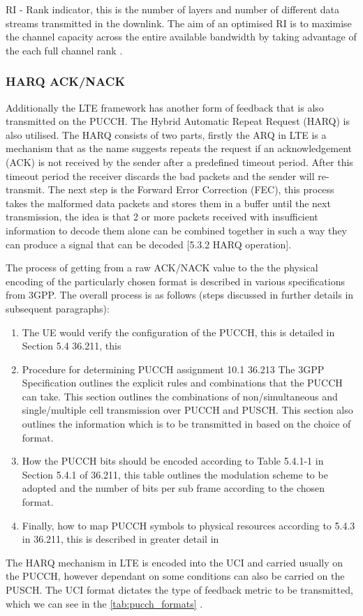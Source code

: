 \documentclass{article}
\begin{document}
RI - Rank indicator,  this is the number of layers and number of different data streams transmitted in the downlink. The aim of an optimised RI is to maximise the channel capacity across the entire available bandwidth by taking advantage of the each full channel rank  \cite{csi_defs}. 

\subsubsection{HARQ ACK/NACK}

Additionally the LTE framework has another form of feedback that is also transmitted on the PUCCH. The Hybrid Automatic Repeat Request (HARQ) is also utilised. The HARQ consists of two parts, firstly the ARQ in LTE is a mechanism that as the name suggests repeats the request if an acknowledgement (ACK) is not received by the sender after a predefined timeout period.  After this timeout period the receiver discards the bad packets and the sender will re-transmit. The next step is the Forward Error Correction (FEC), this process takes the malformed data packets and stores them in a buffer until the next transmission, the idea is that 2 or more packets received with insufficient information to decode them alone can be combined together in such a way they can produce a signal that can be decoded \cite{3gpp36321}[5.3.2 HARQ operation].

The process of getting from a raw ACK/NACK value to the  the physical encoding of the particularly chosen format is described in various specifications from 3GPP. The overall process is as follows (steps discussed in further details in subsequent paragraphs):
\begin{enumerate}\label{proc_pucch_configs}
    \item The UE would verify the configuration of the PUCCH, this is detailed in Section 5.4 36.211, this 
    \item Procedure for determining PUCCH assignment 10.1 36.213 The 3GPP Specification outlines the explicit rules and combinations that the PUCCH can take. This section outlines the combinations of non/simultaneous and single/multiple cell transmission over PUCCH and PUSCH. This section also outlines the information which is to be transmitted in based on the choice of format. 
    \item How the PUCCH bits should be encoded according to Table 5.4.1-1 in Section 5.4.1 of 36.211, this table outlines the modulation scheme to be adopted and the number of bits per sub frame according to the chosen format.
    \item Finally, how to map PUCCH symbols to physical resources according to 5.4.3 in 36.211, this is described in greater detail in  
\end{enumerate} 
The HARQ mechanism in LTE is encoded into the UCI and carried usually on the PUCCH, however dependant on some conditions can also be carried on the PUSCH. The UCI format dictates the type of feedback metric to be transmitted, which we can see in the \cref{tab:pucch_formats} \cite[Section 17.3.1.2]{umts_sesia}. 
\end{document}
